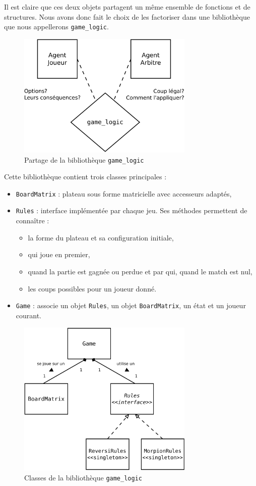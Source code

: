 Il est claire que ces deux objets partagent un même ensemble de fonctions et de structures. Nous avons donc fait le choix de les factoriser dans une bibliothèque que nous appellerons \texttt{game\_logic}.
\begin{figure}[H] 
\centering
\includegraphics[width=0.75\textwidth]{files/env/game_logic_shared} 
\caption{Partage de la bibliothèque \texttt{game\_logic}} 
\label{game_logic_shared}
\end{figure}
Cette bibliothèque contient trois classes principales :
\begin{itemize}
\item \texttt{BoardMatrix} : plateau sous forme matricielle avec accesseurs adaptés,
\item \texttt{Rules} : interface implémentée par chaque jeu. Ses méthodes permettent de connaître :
\begin{itemize}
\item la forme du plateau et sa configuration initiale,
\item qui joue en premier,
\item quand la partie est gagnée ou perdue et par qui, quand le match est nul,
\item les coups possibles pour un joueur donné.
\end{itemize}
\item \texttt{Game} : associe un objet \texttt{Rules}, un objet \texttt{BoardMatrix}, un état et un joueur courant.
\end{itemize}
\begin{figure}[H] 
\centering
\includegraphics[width=0.75\textwidth]{files/env/game_logic} 
\caption{Classes de la bibliothèque \texttt{game\_logic}} 
\label{game_logic}
\end{figure}

